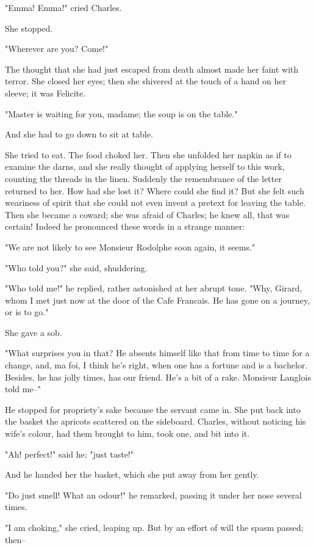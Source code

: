 \documentclass[11pt,twocolumn]{ltugboat}
\begin{document}
"Emma! Emma!" cried Charles.

She stopped.

"Wherever are you? Come!"

The thought that she had just escaped from death almost made her faint
with terror. She closed her eyes; then she shivered at the touch of a
hand on her sleeve; it was Felicite.

"Master is waiting for you, madame; the soup is on the table."

And she had to go down to sit at table.

She tried to eat. The food choked her. Then she unfolded her napkin as
if to examine the darns, and she really thought of applying herself to
this work, counting the threads in the linen. Suddenly the remembrance
of the letter returned to her. How had she lost it? Where could she find
it? But she felt such weariness of spirit that she could not even invent
a pretext for leaving the table. Then she became a coward; she was
afraid of Charles; he knew all, that was certain! Indeed he pronounced
these words in a strange manner:

"We are not likely to see Monsieur Rodolphe soon again, it seems."

"Who told you?" she said, shuddering.

"Who told me!" he replied, rather astonished at her abrupt tone. "Why,
Girard, whom I met just now at the door of the Cafe Francais. He has
gone on a journey, or is to go."

She gave a sob.

"What surprises you in that? He absents himself like that from time
to time for a change, and, ma foi, I think he's right, when one has a
fortune and is a bachelor. Besides, he has jolly times, has our friend.
He's a bit of a rake. Monsieur Langlois told me--"

He stopped for propriety's sake because the servant came in. She put
back into the basket the apricots scattered on the sideboard. Charles,
without noticing his wife's colour, had them brought to him, took one,
and bit into it.

"Ah! perfect!" said he; "just taste!"

And he handed her the basket, which she put away from her gently.

"Do just smell! What an odour!" he remarked, passing it under her nose
several times.

"I am choking," she cried, leaping up. But by an effort of will the
spasm passed; then--
\end{document}
